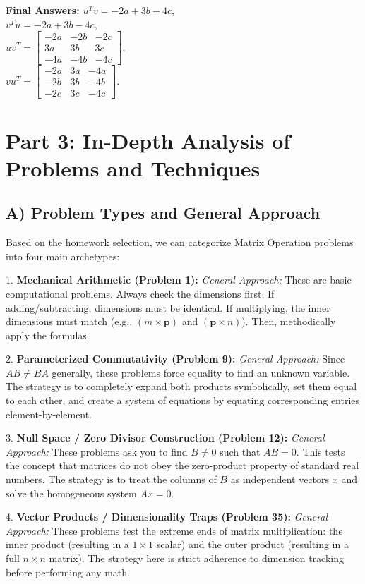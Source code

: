 \documentclass{article}
\begin{document}
\textbf{Final Answers:} 
$u^T v = -2a + 3b - 4c$, \\
$v^T u = -2a + 3b - 4c$, \\
$uv^T = \begin{bmatrix} -2a & -2b & -2c \\ 3a & 3b & 3c \\ -4a & -4b & -4c \end{bmatrix}$, \\
$vu^T = \begin{bmatrix} -2a & 3a & -4a \\ -2b & 3b & -4b \\ -2c & 3c & -4c \end{bmatrix}$.

\newpage
\section*{Part 3: In-Depth Analysis of Problems and Techniques}

\subsection*{A) Problem Types and General Approach}
Based on the homework selection, we can categorize Matrix Operation problems into four main archetypes:

1. \textbf{Mechanical Arithmetic (Problem 1):} 
   \textit{General Approach:} These are basic computational problems. Always check the dimensions first. If adding/subtracting, dimensions must be identical. If multiplying, the inner dimensions must match (e.g., $(m \times \mathbf{p})$ and $(\mathbf{p} \times n)$). Then, methodically apply the formulas.
   
2. \textbf{Parameterized Commutativity (Problem 9):}
   \textit{General Approach:} Since $AB \neq BA$ generally, these problems force equality to find an unknown variable. The strategy is to completely expand both products symbolically, set them equal to each other, and create a system of equations by equating corresponding entries element-by-element.

3. \textbf{Null Space / Zero Divisor Construction (Problem 12):}
   \textit{General Approach:} These problems ask you to find $B \neq 0$ such that $AB = 0$. This tests the concept that matrices do not obey the zero-product property of standard real numbers. The strategy is to treat the columns of $B$ as independent vectors $x$ and solve the homogeneous system $Ax = 0$.

4. \textbf{Vector Products / Dimensionality Traps (Problem 35):}
   \textit{General Approach:} These problems test the extreme ends of matrix multiplication: the inner product (resulting in a $1 \times 1$ scalar) and the outer product (resulting in a full $n \times n$ matrix). The strategy here is strict adherence to dimension tracking before performing any math.
\end{document}
